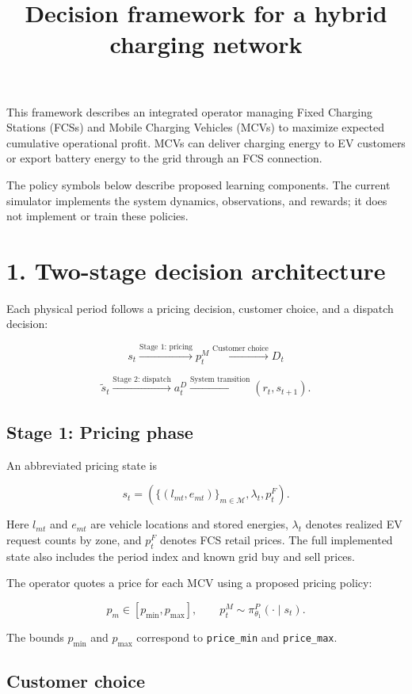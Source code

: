 \documentclass[11pt,letterpaper]{article}
\title{Decision framework for a hybrid charging network}
\author{}
\date{}
\begin{document}
\maketitle


This framework describes an integrated operator managing Fixed Charging Stations (FCSs) and Mobile Charging Vehicles (MCVs) to maximize expected cumulative operational profit. MCVs can deliver charging energy to EV customers or export battery energy to the grid through an FCS connection.

The policy symbols below describe proposed learning components. The current simulator implements the system dynamics, observations, and rewards; it does not implement or train these policies.

\section*{1. Two-stage decision architecture}


Each physical period follows a pricing decision, customer choice, and a dispatch decision:

\[
s_t
\xrightarrow{\text{Stage 1: pricing}} p_t^M
\xrightarrow{\text{Customer choice}} D_t
\]


\[
\widetilde{s}_t
\xrightarrow{\text{Stage 2: dispatch}} a_t^D
\xrightarrow{\text{System transition}} (r_t,s_{t+1}).
\]


\subsection*{Stage 1: Pricing phase}


An abbreviated pricing state is

\[
s_t =
\left(
\{(l_{mt},e_{mt})\}_{m\in\mathcal{M}},
\lambda_t,p_t^F
\right).
\]


Here $l_{mt}$ and $e_{mt}$ are vehicle locations and stored energies, $\lambda_t$ denotes realized EV request counts by zone, and $p_t^F$ denotes FCS retail prices. The full implemented state also includes the period index and known grid buy and sell prices.

The operator quotes a price for each MCV using a proposed pricing policy:

\[
p_m\in[p_{\min},p_{\max}],
\qquad
p_t^M\sim\pi^P_{\theta_1}(\cdot\mid s_t).
\]


The bounds $p_{\min}$ and $p_{\max}$ correspond to \texttt{price\_min} and \texttt{price\_max}.

\subsection*{Customer choice}
\end{document}
